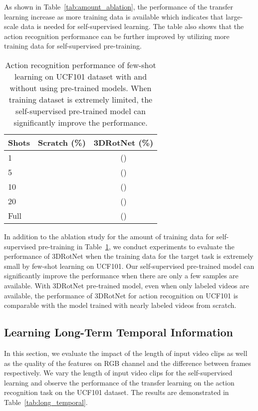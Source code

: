 \documentclass[10pt,twocolumn,letterpaper]{article}
\begin{document}
As shown in Table~\ref{tab:amount_ablation}, the performance of the transfer learning increase as more training data is available which indicates that large-scale data is needed for self-supervised learning. The table also shows that the action recognition performance can be further improved by utilizing more training data for self-supervised pre-training.

\begin{table}[!h]
\begin{center}
\begin{tabular}{l|c|c}
\hline
Shots          & Scratch (\%)    & 3DRotNet (\%)\\
\hline\hline
1              &            &   ()\\
5              &           &   ()\\
10             &           &   ()\\
20             &           &   ()\\
Full           &           &   ()\\
\hline
\end{tabular}
\end{center}
\caption{Action recognition performance of few-shot learning on UCF101 dataset with and without using pre-trained models. When training dataset is extremely limited, the self-supervised pre-trained model can significantly improve the performance.}
\label{tab:few_shots}
\end{table}



In addition to the ablation study for the amount of training data for self-supervised pre-training in Table~\ref{tab:few_shots}, we conduct experiments to evaluate the performance of 3DRotNet when the training data for the target task is extremely small by few-shot learning on UCF101. Our self-supervised pre-trained model can significantly improve the performance when there are only a few samples are available. With 3DRotNet pre-trained model, even when only  labeled videos are available, the performance of 3DRotNet for action recognition on UCF101 is comparable with the model trained with nearly  labeled videos from scratch.

\subsection{Learning Long-Term Temporal Information}

In this section, we evaluate the impact of the length of input video clips as well as the quality of the features on RGB channel and the difference between frames respectively. We vary the length of input video clips for the self-supervised learning and observe the performance of the transfer learning on the action recognition task on the UCF101 dataset. The results are demonstrated in Table~\ref{tab:long_temporal}.
\end{document}
